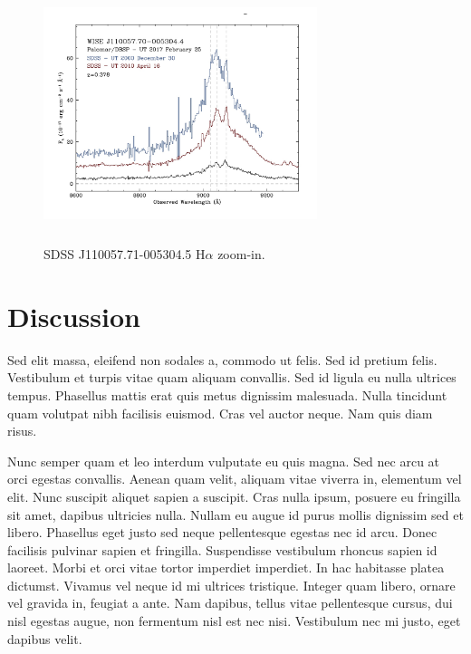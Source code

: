\documentclass{emulateapj}
\begin{document}
\begin{figure}
  \includegraphics[width=8.00cm, height=7.50cm, trim=0.0cm 0.0cm 0.0cm 0.0cm, clip]
  {../plots/spectra/w1100m0052_halpha.jpg}
  \centering
  \caption[]{SDSS J110057.71-005304.5 H$\alpha$ zoom-in.}
 \label{fig:w1100m0052_halpha}
\end{figure}



\section{Discussion}
Sed elit massa, eleifend non sodales a, commodo ut felis. Sed id
pretium felis. Vestibulum et turpis vitae quam aliquam convallis. Sed
id ligula eu nulla ultrices tempus. Phasellus mattis erat quis metus
dignissim malesuada. Nulla tincidunt quam volutpat nibh facilisis
euismod. Cras vel auctor neque. Nam quis diam risus.

Nunc semper quam et leo interdum vulputate eu quis magna. Sed nec arcu
at orci egestas convallis. Aenean quam velit, aliquam vitae viverra
in, elementum vel elit. Nunc suscipit aliquet sapien a suscipit. Cras
nulla ipsum, posuere eu fringilla sit amet, dapibus ultricies
nulla. Nullam eu augue id purus mollis dignissim sed et
libero. Phasellus eget justo sed neque pellentesque egestas nec id
arcu. Donec facilisis pulvinar sapien et fringilla. Suspendisse
vestibulum rhoncus sapien id laoreet. Morbi et orci vitae tortor
imperdiet imperdiet. In hac habitasse platea dictumst. Vivamus vel
neque id mi ultrices tristique. Integer quam libero, ornare vel
gravida in, feugiat a ante. Nam dapibus, tellus vitae pellentesque
cursus, dui nisl egestas augue, non fermentum nisl est nec
nisi. Vestibulum nec mi justo, eget dapibus velit.
\end{document}
